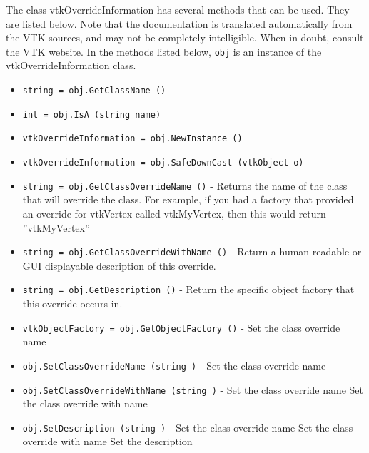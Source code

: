The class vtkOverrideInformation has several methods that can be used.
  They are listed below.
Note that the documentation is translated automatically from the VTK sources,
and may not be completely intelligible.  When in doubt, consult the VTK website.
In the methods listed below, \verb|obj| is an instance of the vtkOverrideInformation class.
\begin{itemize}
\item  \verb|string = obj.GetClassName ()|

\item  \verb|int = obj.IsA (string name)|

\item  \verb|vtkOverrideInformation = obj.NewInstance ()|

\item  \verb|vtkOverrideInformation = obj.SafeDownCast (vtkObject o)|

\item  \verb|string = obj.GetClassOverrideName ()| -  Returns the name of the class that will override the class.
 For example, if you had a factory that provided an override for
 vtkVertex called vtkMyVertex, then this would return ''vtkMyVertex''

\item  \verb|string = obj.GetClassOverrideWithName ()| -  Return a human readable or GUI displayable description of this
 override.   

\item  \verb|string = obj.GetDescription ()| -  Return the specific object factory that this override occurs in.

\item  \verb|vtkObjectFactory = obj.GetObjectFactory ()| -  Set the class override name

\item  \verb|obj.SetClassOverrideName (string )| -  Set the class override name

\item  \verb|obj.SetClassOverrideWithName (string )| -  Set the class override name
 Set the class override with name

\item  \verb|obj.SetDescription (string )| -  Set the class override name
 Set the class override with name
 Set the description

\end{itemize}
